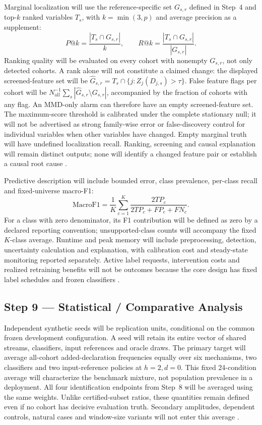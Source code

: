 Marginal localization will use the reference-specific set $G_{s,r}$ defined in Step~4 and top-$k$ ranked variables $T_s$, with $k=\min(3,p)$ and average precision as a supplement:
\begin{equation}
P@k=\frac{|T_s\cap G_{s,r}|}{k},\qquad R@k=\frac{|T_s\cap G_{s,r}|}{|G_{s,r}|}.
\end{equation}
Ranking quality will be evaluated on every cohort with nonempty $G_{s,r}$, not only detected cohorts. A rank alone will not constitute a claimed change: the displayed screened-feature set will be $\widehat G_{s,r}=T_s\cap\{j:Z_j(D_{j,s})>\tau\}$. False feature flags per cohort will be $N_{\mathrm{all}}^{-1}\sum_s|\widehat G_{s,r}\setminus G_{s,r}|$, accompanied by the fraction of cohorts with any flag. An MMD-only alarm can therefore have an empty screened-feature set. The maximum-score threshold is calibrated under the complete stationary null; it will not be advertised as strong family-wise error or false-discovery control for individual variables when other variables have changed. Empty marginal truth will have undefined localization recall. Ranking, screening and causal explanation will remain distinct outputs; none will identify a changed feature pair or establish a causal root cause \cite{szucs,causal,gretton}.

Predictive description will include bounded error, class prevalence, per-class recall and fixed-universe macro-F1:
\begin{equation}
\mathrm{MacroF1}=\frac{1}{K}\sum_{c=1}^{K}\frac{2TP_c}{2TP_c+FP_c+FN_c}.
\end{equation}
For a class with zero denominator, its F1 contribution will be defined as zero by a declared reporting convention; unsupported-class counts will accompany the fixed $K$-class average. Runtime and peak memory will include preprocessing, detection, uncertainty calculation and explanation, with calibration cost and steady-state monitoring reported separately. Active label requests, intervention costs and realized retraining benefits will not be outcomes because the core design has fixed label schedules and frozen classifiers \cite{guerrero,souza}.

\subsection*{Step 9 --- Statistical / Comparative Analysis}
Independent synthetic seeds will be replication units, conditional on the common frozen development configuration. A seed will retain its entire vector of shared streams, classifiers, input references and oracle draws. The primary target will average all-cohort added-declaration frequencies equally over six mechanisms, two classifiers and two input-reference policies at $h=2,d=0$. This fixed 24-condition average will characterize the benchmark mixture, not population prevalence in a deployment. All four identification endpoints from Step~8 will be averaged using the same weights. Unlike certified-subset ratios, these quantities remain defined even if no cohort has decisive evaluation truth. Secondary amplitudes, dependent controls, natural cases and window-size variants will not enter this average \cite{souza,hoeffding}.

